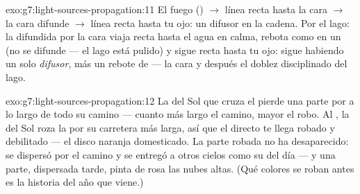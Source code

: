 \begin{solution}{exo:g7:light-sources-propagation:11}
El fuego () $\to$ línea recta hasta la cara $\to$ la
cara difunde $\to$ línea recta hasta tu ojo: un difusor en la cadena.
Por el lago: la  difundida por la cara viaja recta hasta el agua
en calma, rebota como en un  (no se difunde --- el lago está
pulido) y sigue recta hasta tu ojo: sigue habiendo un solo
\emph{difusor}, más un rebote de  --- la cara y después el
doblez disciplinado del lago.
\end{solution}

\begin{solution}{exo:g7:light-sources-propagation:12}
La  del Sol que cruza el  pierde una parte por
 a lo largo de todo su camino --- cuanto más largo el
camino, mayor el robo. Al , la  del Sol roza la
 por su carretera más larga, así que el  directo
te llega robado y debilitado --- el disco naranja domesticado. La parte
robada no ha desaparecido: se dispersó por el camino y se entregó a
otros cielos como su  del día --- y una parte, dispersada tarde,
pinta de rosa las nubes altas. (Qué colores se roban antes es la
historia del año que viene.)
\end{solution}

